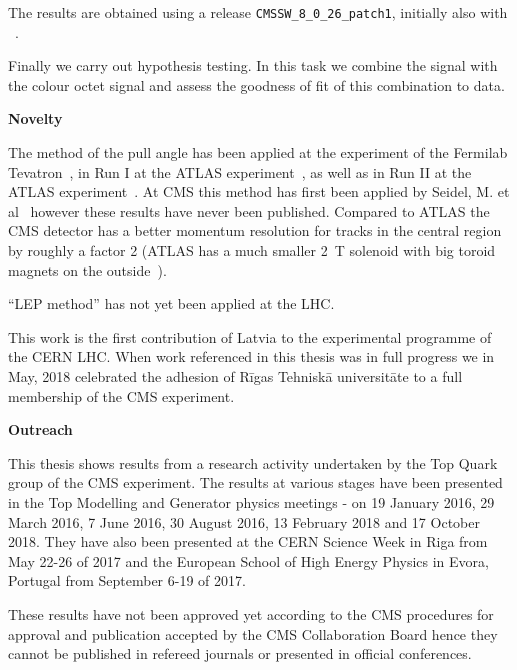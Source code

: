 The results are obtained using a \CMSSW release \lstinline[language=sh]|CMSSW_8_0_26_patch1|, initially also with \RIVET~\cite{Buckley:2010ar}.

Finally we carry out hypothesis testing. In this task we combine the \ttbar signal with the colour octet \PW signal and assess the goodness of fit of this combination to data. 

\medskip
\textbf{Novelty}
\nopagebreak\medskip

The method of the pull angle has been applied at the \DZERO experiment of the Fermilab Tevatron~\cite{Abazov:2011vh}, in Run I at the ATLAS experiment~\cite{Aad:2015lxa}, as well as in Run II at the ATLAS experiment~\cite{Aaboud:2018ibj}. At CMS this method has first been applied by Seidel, M. et al~\cite{indico:Markus_cf} however these results have never been published. Compared to ATLAS the CMS detector has a better momentum resolution for tracks in the central region by roughly a factor 2 (ATLAS has a much smaller 2~T solenoid with big toroid magnets on the outside~\cite{Aad:2008zzm}).

``LEP method'' has not yet been applied at the LHC.

This work is the first contribution of Latvia to the experimental programme of the CERN LHC. When work referenced in this thesis was in full progress we in May, 2018 celebrated the adhesion of Rīgas Tehniskā universitāte to a full membership of the CMS experiment. 

\medskip
\textbf{Outreach}
\nopagebreak\medskip

This thesis shows results from a research activity undertaken by the Top Quark group of the CMS experiment. The results at various stages have been presented in the Top Modelling and Generator physics meetings - on 19 January 2016, 29 March 2016, 7 June 2016, 30 August 2016, 13 February 2018 and 17 October 2018. They have also been presented at the CERN Science Week in Riga from May 22-26 of 2017 and the European School of High Energy Physics in Evora, Portugal from September 6-19 of 2017.

These results have not been approved yet according to the CMS procedures for approval and publication accepted by the CMS Collaboration Board hence they cannot be published in refereed journals or presented in official conferences.
